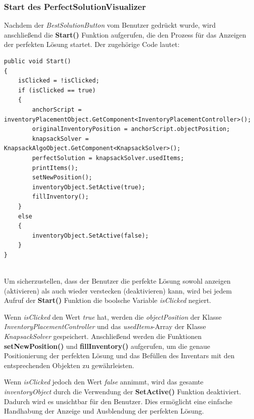 \subsubsection{Start des PerfectSolutionVisualizer}
Nachdem der \textit{BestSolutionButton} vom Benutzer gedrückt wurde, wird anschließend die \textbf{Start()} Funktion
aufgerufen, die den Prozess für das Anzeigen der perfekten Lösung startet. Der zugehörige Code lautet:
\begin{lstlisting}[style=csharp, caption={PerfectSolutionVisualizer Start}, label=code:Start_PSV]
public void Start()
{
    isClicked = !isClicked;
    if (isClicked == true)
    {
        anchorScript = inventoryPlacementObject.GetComponent<InventoryPlacementController>();
        originalInventoryPosition = anchorScript.objectPosition;
        knapsackSolver = KnapsackAlgoObject.GetComponent<KnapsackSolver>();
        perfectSolution = knapsackSolver.usedItems;
        printItems();
        setNewPosition();
        inventoryObject.SetActive(true);
        fillInventory();
    }
    else
    {
        inventoryObject.SetActive(false);
    }
}
\end{lstlisting}\\
Um sicherzustellen, dass der Benutzer die perfekte Lösung sowohl anzeigen (aktivieren) als auch wieder verstecken (deaktivieren)
kann, wird bei jedem Aufruf der \textbf{Start()} Funktion die boolsche Variable \textit{isClicked} negiert.

Wenn \textit{isClicked} den Wert \textit{true} hat, werden die \textit{objectPosition} der Klasse \textit{InventoryPlacementController}
und das \textit{usedItems}-Array der Klasse \textit{KnapsackSolver} gespeichert. Anschließend werden die Funktionen
\textbf{setNewPosition()} und \textbf{fillInventory()} aufgerufen, um die genaue Positionierung der perfekten Lösung und
das Befüllen des Inventars mit den entsprechenden Objekten zu gewährleisten.

Wenn \textit{isClicked} jedoch den Wert \textit{false} annimmt, wird das gesamte \textit{inventoryObject} durch die
Verwendung der \textbf{SetActive()} Funktion deaktiviert. Dadurch wird es unsichtbar für den Benutzer. Dies ermöglicht
eine einfache Handhabung der Anzeige und Ausblendung der perfekten Lösung.

